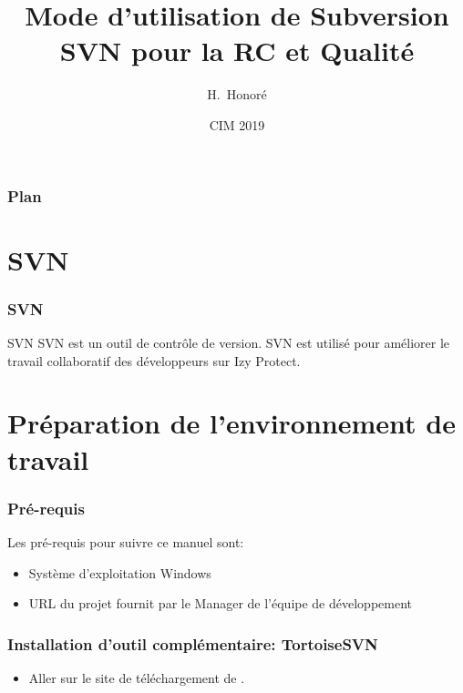 \documentclass{beamer}
\title[Mode d'utlisation SVN] %
{Mode d'utilisation de Subversion SVN pour la RC et Qualité}
\author[HOUEKPETODJI, Honoré] %
{ H.~Honoré}
\date [2019] %
{CIM 2019}
\begin{document}
\frame{\titlepage}


\begin{frame}
\frametitle{Plan}
\tableofcontents
\end{frame}

\section{SVN}
\begin{frame}
\frametitle{SVN}
\begin{block}{SVN}
SVN est un outil de contrôle de version. SVN est utilisé pour améliorer le travail collaboratif des développeurs sur Izy Protect.
\end{block}

\end{frame}

\section{Préparation de l'environnement de travail}

\begin{frame}[label={preparation}]
\frametitle{Pré-requis}
Les pré-requis pour suivre ce manuel sont:
\begin{itemize}
    \item Système d'exploitation Windows
    \item \alert{URL} du projet fournit par le Manager de l'équipe de développement
\end{itemize}
\end{frame}

\begin{frame}
\frametitle{Installation d'outil complémentaire: TortoiseSVN }
\begin{itemize}
\item Aller sur le site de téléchargement de \href{https://tortoisesvn.net/downloads.html}{}. 
\end{itemize}
\end{frame}
\end{document}
